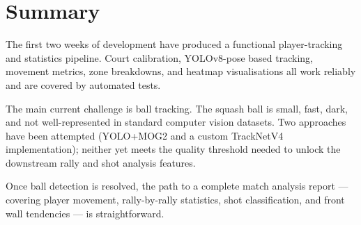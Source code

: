 \documentclass[12pt,a4paper]{article}
\begin{document}
\section{Summary}

The first two weeks of development have produced a functional player-tracking and statistics pipeline. Court calibration, YOLOv8-pose based tracking, movement metrics, zone breakdowns, and heatmap visualisations all work reliably and are covered by automated tests.

The main current challenge is ball tracking. The squash ball is small, fast, dark, and not well-represented in standard computer vision datasets. Two approaches have been attempted (YOLO+MOG2 and a custom TrackNetV4 implementation); neither yet meets the quality threshold needed to unlock the downstream rally and shot analysis features.

Once ball detection is resolved, the path to a complete match analysis report --- covering player movement, rally-by-rally statistics, shot classification, and front wall tendencies --- is straightforward.
\end{document}
